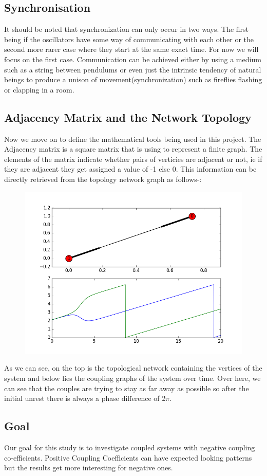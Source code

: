 \subsection{Synchronisation}
It should be noted that synchronization can only occur in two ways. The first being if the oscillators have some way of communicating with each other or the second more rarer case where they start at the same exact time. For now we will focus on the first case. Communication can be achieved either by using a medium such as a string between pendulums or even just the intrinsic tendency of natural beings to produce a unison of movement(synchronization) such as fireflies flashing or clapping in a room.

\subsection{Adjacency Matrix and the Network Topology }
Now we move on to define the mathematical tools being used in this project. The Adjacency matrix is a square matrix that is using to represent a finite graph. The elements of the matrix indicate whether pairs of verticies are adjacent or not, ie if they are adjacent they get assigned a value of -1 else 0. This information can be directly retrieved from the topology network graph as follows-:

\begin{figure}[h!]
\centering
\includegraphics[width=0.5\linewidth]{imgs/examplefigure}
\caption{}
\end{figure}

As we can see, on the top is the topological network containing the vertices of the system and below lies the coupling graphs of the system over time. Over here, we can see that the couples are trying to stay as far away as possible so after the initial unrest there is always a phase difference of 2$\pi$.

\subsection{Goal}
Our goal for this study is to investigate coupled systems with negative coupling co-efficients. Positive Coupling Coefficients can have expected looking patterns but the results get more interesting for negative ones.

